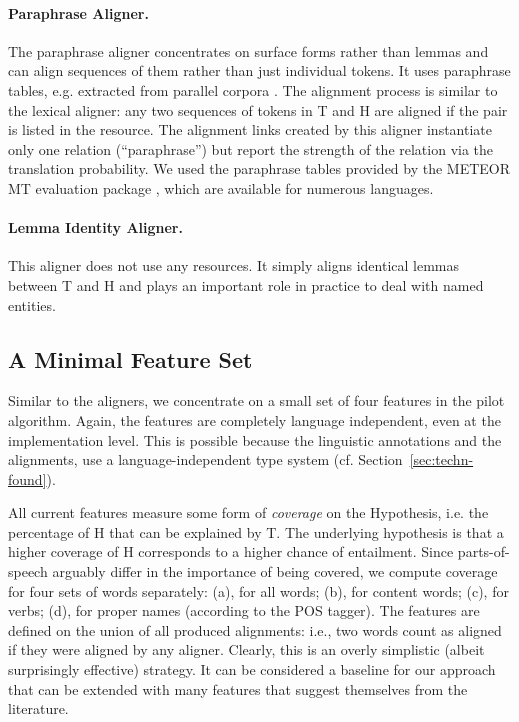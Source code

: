 \documentclass[11pt,a4paper]{article}
\begin{document}
\paragraph{Paraphrase Aligner.} The paraphrase aligner concentrates on
surface forms rather than lemmas and can align sequences of them
rather than just individual tokens. It uses paraphrase tables, e.g.
extracted from parallel corpora
\cite{bannard05:_parap_bilin_paral_corpor}. The alignment process is
similar to the lexical aligner: any two sequences of tokens in T and H 
are aligned if the pair is listed in the resource.  The alignment
links created by this aligner instantiate only one relation
(``paraphrase'') but report the strength of the relation via the
translation probability. We used the paraphrase tables provided by the
METEOR MT evaluation package \cite{denkowski-lavie:2014:W14-33}, which
are available for numerous languages. 

\paragraph{Lemma Identity Aligner.} This aligner does not use any
resources. It simply aligns identical lemmas between T and H and plays
an important role in practice to deal with named entities.

\subsection{A Minimal Feature Set} 

Similar to the aligners, we concentrate on a small set of four
features in the pilot algorithm. Again, the features are completely
language independent, even at the implementation level. This is
possible because the linguistic annotations and the alignments, use a
language-independent type system (cf. Section~\ref{sec:techn-found}).

All current features measure some form of \textit{coverage} on the
Hypothesis, i.e. the percentage of H that can be explained by T. The
underlying hypothesis is that a higher coverage of H corresponds to a
higher chance of entailment. Since parts-of-speech arguably differ in
the importance of being covered, we compute coverage for four sets of
words separately: (a), for all words; (b), for content words; (c), for
verbs; (d), for proper names (according to the POS tagger). The
features are defined on the union of all produced alignments: i.e.,
two words count as aligned if they were aligned by any aligner. 
Clearly, this is an overly simplistic (albeit surprisingly effective)
strategy. It can be considered a baseline for our approach that can be
extended with many features that suggest themselves from the
literature. 
\end{document}
